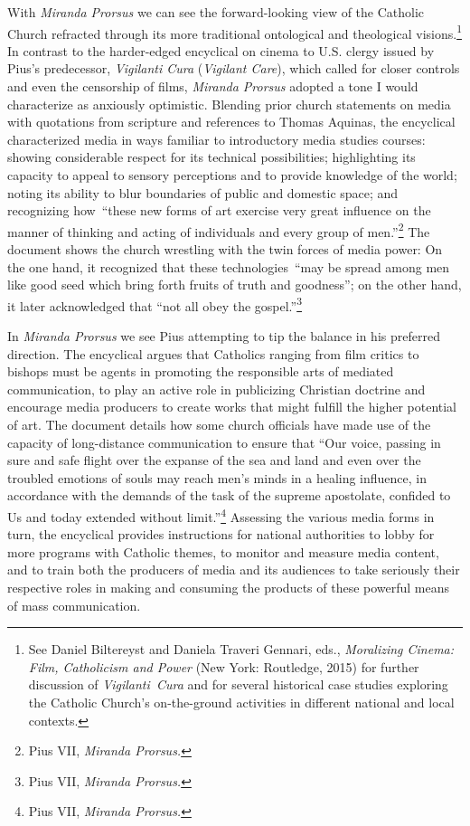 \documentclass{tufte-handout}
\begin{document}
With \emph{Miranda Prorsus} we can see the forward-looking view of the
Catholic Church refracted through its more traditional ontological and
theological visions.\footnote{See Daniel Biltereyst and Daniela Traveri Gennari, eds., \emph{Moralizing Cinema: Film, Catholicism and Power} (New York: Routledge, 2015) for further discussion of \emph{Vigilanti Cura} and for several historical case studies exploring the Catholic Church’s on-the-ground activities in different national and local contexts.} In contrast to the harder-edged encyclical on
cinema to U.S. clergy issued by Pius's predecessor, \emph{Vigilanti
Cura} (\emph{Vigilant Care}), which called for closer controls and even
the censorship of films, \emph{Miranda Prorsus} adopted a tone I would
characterize as anxiously optimistic. Blending prior church statements
on media with quotations from scripture and references to Thomas
Aquinas, the encyclical characterized media in ways familiar to
introductory media studies courses: showing considerable respect for its
technical possibilities; highlighting its capacity to appeal to sensory
perceptions and to provide knowledge of the world; noting its ability to
blur boundaries of public and domestic space; and recognizing
how~``these new forms of art exercise very great influence on the manner
of thinking and acting of individuals and every group of
men.''\footnote{Pius VII, \emph{Miranda Prorsus.}} The document shows
the church wrestling with the twin forces of media power: On the one
hand, it recognized that these technologies~``may be spread among men
like good seed which bring forth fruits of truth and goodness''; on the
other hand, it later acknowledged that ``not all obey the
gospel.''\footnote{Pius VII, \emph{Miranda Prorsus.}}

In \emph{Miranda Prorsus} we see Pius attempting to tip the balance in
his preferred direction. The encyclical argues that Catholics ranging
from film critics to bishops must be agents in promoting the responsible
arts of mediated communication, to play an active role in publicizing
Christian doctrine and encourage media producers to create works that
might fulfill the higher potential of art. The document details how some
church officials have made use of the capacity of long-distance
communication to ensure that ``Our voice, passing in sure and safe
flight over the expanse of the sea and land and even over the troubled
emotions of souls may reach men's minds in a healing influence, in
accordance with the demands of the task of the supreme apostolate,
confided to Us and today extended without limit.''\footnote{Pius VII,
  \emph{Miranda Prorsus.}} Assessing the various media forms in turn,
the encyclical provides instructions for national authorities to lobby
for more programs with Catholic themes, to monitor and measure media
content, and to train both the producers of media and its audiences to
take seriously their respective roles in making and consuming the
products of these powerful means of mass communication.
\end{document}
